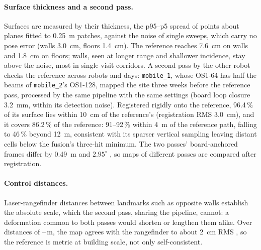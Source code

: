 \paragraph{Surface thickness and a second pass.} Surfaces are measured
by their thickness, the p95--p5 spread of points about planes fitted to
\SI{0.25}{\metre} patches, against the noise of single sweeps, which
carry no pose error (walls \SI{3.0}{\centi\metre}, floors
\SI{1.4}{\centi\metre}). The reference reaches
\SI{7.6}{\centi\metre} on walls and \SI{1.8}{\centi\metre} on floors;
walls, seen at longer range and shallower incidence, stay above the
noise, most in single-visit corridors. A second pass by the other robot
checks the reference across robots and days:
\texttt{mobile\_1}, whose OS1-64 has half the beams of \texttt{mobile\_2}'s OS1-128,
mapped the site three weeks before the reference pass, processed by the
same pipeline with the same settings (board loop closure
\SI{3.2}{\milli\metre}, within its detection noise). Registered rigidly
onto the reference, 96.4\,\% of its surface lies within
\SI{10}{\centi\metre} of the reference's (registration RMS
\SI{3.0}{\centi\metre}), and it covers 86.2\,\% of the reference:
91--92\,\% within \SI{4}{\metre} of the reference path, falling to
46\,\% beyond \SI{12}{\metre}, consistent with its sparser vertical
sampling leaving distant cells below the fusion's three-hit minimum.
The two passes' board-anchored frames differ by \SI{0.49}{\metre} and
$2.95^\circ$ , so maps of different passes are compared after
registration.

\paragraph{Control distances.} Laser-rangefinder distances between
landmarks such as opposite walls establish the absolute scale, which
the second pass, sharing the pipeline, cannot: a deformation common to
both passes would shorten or lengthen them alike. Over 
distances of --\,\si{\metre}, the map agrees with the
rangefinder to about \SI{2}{\centi\metre} RMS , so the reference is metric at building scale, not only
self-consistent.

